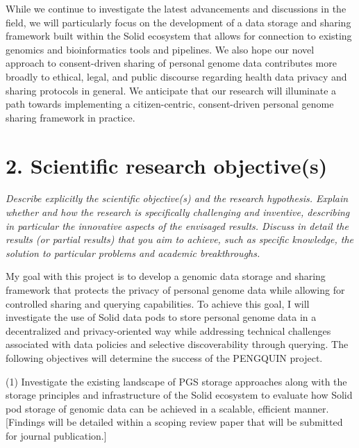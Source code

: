 \documentclass{article}
\begin{document}
While we continue to investigate the latest advancements and discussions in the field, we will particularly focus on the development of a data storage and sharing framework built within the Solid ecosystem that allows for connection to existing genomics and bioinformatics tools and pipelines. We also hope our novel approach to consent-driven sharing of personal genome data contributes more broadly to ethical, legal, and public discourse regarding health data privacy and sharing protocols in general. We anticipate that our research will illuminate a path towards implementing a citizen-centric, consent-driven personal genome sharing framework in practice.


\section{2. Scientific research objective(s)}
\textit{Describe explicitly the scientific objective(s) and the research hypothesis. Explain whether and how the research is specifically challenging and inventive, describing in particular the innovative aspects of the envisaged results. Discuss in detail the results (or partial results) that you aim to achieve, such as specific knowledge, the solution to particular problems and academic breakthroughs.}

My goal with this project is to develop a genomic data storage and sharing framework that protects the privacy of personal genome data while allowing for controlled sharing and querying capabilities.  To achieve this goal, I will investigate the use of Solid data pods to store personal genome data in a decentralized and privacy-oriented way while addressing technical challenges associated with data policies and selective discoverability through querying. The following objectives will determine the success of the PENGQUIN project.


(1) Investigate the existing landscape of PGS storage approaches along with the storage principles and infrastructure of the Solid ecosystem to evaluate how Solid pod storage of genomic data can be achieved in a scalable, efficient manner. [Findings will be detailed within a scoping review paper that will be submitted for journal publication.]
\end{document}
